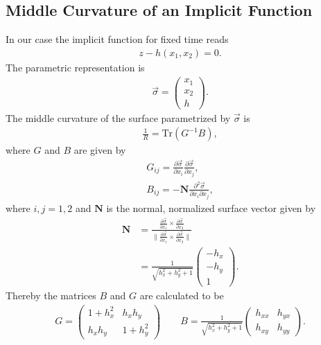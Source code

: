 \subsection{Middle Curvature of an Implicit Function}
\label{appendix:curvature}
In our case the implicit function for fixed time reads
\begin{align}
    z-h\left(x_1,x_2\right) = 0.
\end{align}
The parametric representation is
\begin{align}
    \vec{\sigma} = \begin{pmatrix} x_1 \\ x_2 \\ h \end{pmatrix} .
\end{align}
The middle curvature of the surface parametrized by $\vec{\sigma}$ is
\begin{align}
    \frac{1}{R} = \text{Tr}(G^{-1}B),
\end{align}
where $G$ and $B$ are given by
\begin{align}
    G_{ij} = \frac{\partial \vec{\sigma}}{\partial x_i} \frac{\partial
    \vec{\sigma}}{\partial x_j}, \\
    B_{ij} = -\mathbf{N} \frac{\partial^2 \vec{\sigma}}{\partial
    x_i\partial x_j},
\end{align}
where $i, j = 1, 2$ and $\mathbf{N}$ is the normal, normalized surface vector given by
\begin{align}
    \mathbf{N} &= \frac{\frac{\partial \vec{\sigma}}{\partial x_1}\times
    \frac{\partial \vec{\sigma}}{\partial x_2}}{\|\frac{\partial \vec{\sigma}}{\partial x_1}\times
    \frac{\partial \vec{\sigma}}{\partial x_2}\|} \\
               &= \frac{1}{\sqrt{h_x^2 + h_y^2 +1}} \begin{pmatrix}
               -h_x\\-h_y\\1 \end{pmatrix}.
\end{align}
Thereby the matrices $B$ and $G$ are calculated to be
\begin{align}
    G = \begin{pmatrix} 1+h_x^2 & h_xh_y\\h_xh_y & 1+h_y^2 \end{pmatrix}
    \qquad
    B =\frac{1}{\sqrt{h_x^2 +h_y^2 +1} } \begin{pmatrix}h_{x x} &
    h_{yx}\\h_{x y} & h_{yy}  \end{pmatrix}.
\end{align}
